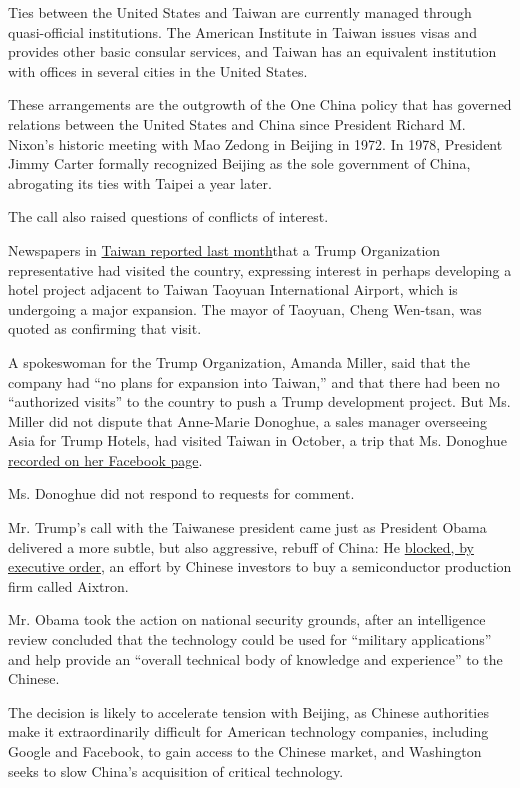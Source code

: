 Ties between the United States and Taiwan are currently managed through
quasi-official institutions. The American Institute in Taiwan issues
visas and provides other basic consular services, and Taiwan has an
equivalent institution with offices in several cities in the United
States.

These arrangements are the outgrowth of the One China policy that has
governed relations between the United States and China since President
Richard M. Nixon's historic meeting with Mao Zedong in Beijing in 1972.
In 1978, President Jimmy Carter formally recognized Beijing as the sole
government of China, abrogating its ties with Taipei a year later.

The call also raised questions of conflicts of interest.

Newspapers in \href{http://www.taiwannews.com.tw/en/news/3031091}{Taiwan
reported last month}that a Trump Organization representative had visited
the country, expressing interest in perhaps developing a hotel project
adjacent to Taiwan Taoyuan International Airport, which is undergoing a
major expansion. The mayor of Taoyuan, Cheng Wen-tsan, was quoted as
confirming that visit.

A spokeswoman for the Trump Organization, Amanda Miller, said that the
company had ``no plans for expansion into Taiwan,'' and that there had
been no ``authorized visits'' to the country to push a Trump development
project. But Ms. Miller did not dispute that Anne-Marie Donoghue, a
sales manager overseeing Asia for Trump Hotels, had visited Taiwan in
October, a trip that Ms. Donoghue
\href{https://www.documentcloud.org/documents/3230995-10-Anne-Marie-Donoghue-Trump.html}{recorded
on her Facebook page}.

Ms. Donoghue did not respond to requests for comment.

Mr. Trump's call with the Taiwanese president came just as President
Obama delivered a more subtle, but also aggressive, rebuff of China: He
\href{http://www.nytimes.com/2016/12/02/business/dealbook/china-aixtron-obama-cfius.html}{blocked,
by executive order}, an effort by Chinese investors to buy a
semiconductor production firm called Aixtron.

Mr. Obama took the action on national security grounds, after an
intelligence review concluded that the technology could be used for
``military applications'' and help provide an ``overall technical body
of knowledge and experience'' to the Chinese.

The decision is likely to accelerate tension with Beijing, as Chinese
authorities make it extraordinarily difficult for American technology
companies, including Google and Facebook, to gain access to the Chinese
market, and Washington seeks to slow China's acquisition of critical
technology.

